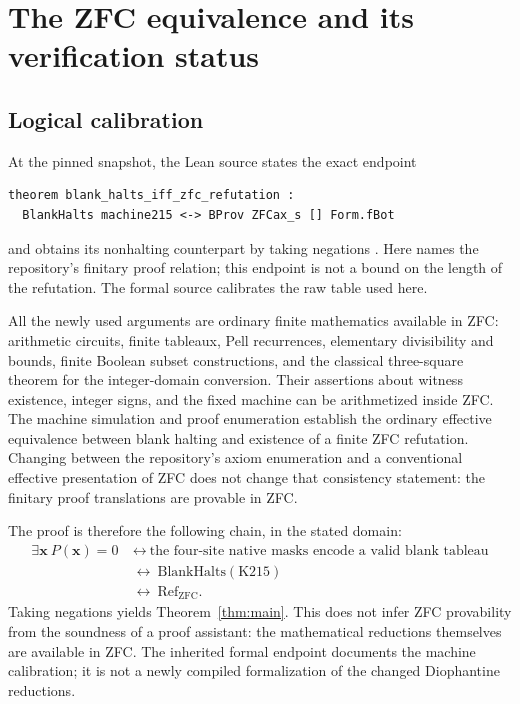 \documentclass[11pt,a4paper]{article}
\theoremstyle{remark}\newtheorem{remark}[theorem]{Remark}
\newcommand{\src}[1]{\texttt{\detokenize{#1}}}
\begin{document}
\section{The ZFC equivalence and its verification status}
\label{sec:logical}

\subsection{Logical calibration}

At the pinned snapshot, the Lean source \src{KEndpoint215.lean}
states the exact endpoint
\begin{lstlisting}
theorem blank_halts_iff_zfc_refutation :
  BlankHalts machine215 <-> BProv ZFCax_s [] Form.fBot
\end{lstlisting}
and obtains its nonhalting counterpart by taking negations
\cite{endpoint}. Here \src{BProv} names the repository's finitary
proof relation; this endpoint is not a bound on the length of the
refutation. The formal source calibrates the raw table used here.

All the newly used arguments are ordinary finite mathematics available
in ZFC: arithmetic circuits, finite tableaux, Pell recurrences,
elementary divisibility and bounds, finite Boolean subset constructions,
and the classical three-square theorem for the integer-domain conversion.
Their assertions about witness existence, integer signs, and the fixed
machine can be arithmetized inside ZFC. The machine simulation and proof
enumeration establish the ordinary effective equivalence between
blank halting and existence of a finite ZFC refutation. Changing between
the repository's axiom enumeration and a conventional effective
presentation of ZFC does not change that consistency statement: the
finitary proof translations are provable in ZFC.

The proof is therefore the following chain, in the stated domain:
\begin{align*}
 \exists\mathbf x\ P(\mathbf x)=0
 &\ \longleftrightarrow\
 \text{the four-site native masks encode a valid blank tableau}\\
 &\ \longleftrightarrow\ \mathrm{BlankHalts}(\mathrm{K215})\\
 &\ \longleftrightarrow\ \mathrm{Ref}_{\mathrm{ZFC}}.
\end{align*}
Taking negations yields Theorem~\ref{thm:main}. This does not infer
ZFC provability from the soundness of a proof assistant: the
mathematical reductions themselves are available in ZFC. The inherited
formal endpoint documents the machine calibration; it is not a
newly compiled formalization of the changed Diophantine reductions.
\end{document}
